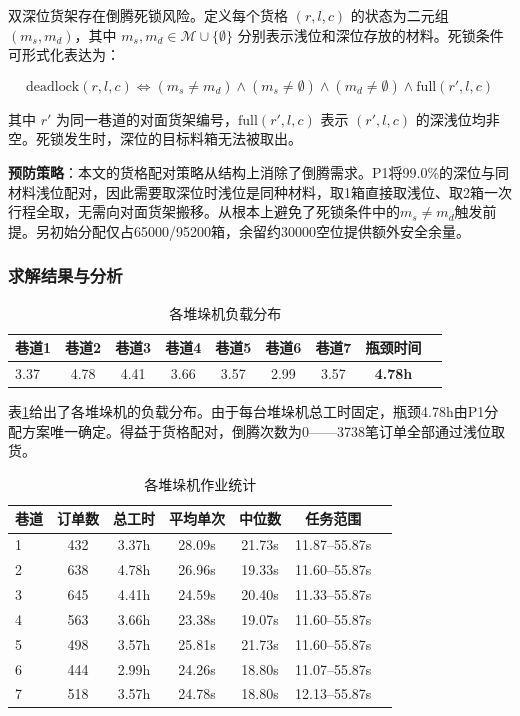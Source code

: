 \documentclass[a4paper]{cumcmthesis}
\newcommand{\headcol}{\rowcolor{tableheadcolor}}
\begin{document}
双深位货架存在倒腾死锁风险。定义每个货格 $(r,l,c)$ 的状态为二元组 $(m_s, m_d)$，其中 $m_s, m_d\in\mathcal{M}\cup\{\emptyset\}$ 分别表示浅位和深位存放的材料。死锁条件可形式化表达为：

\begin{equation}
\text{deadlock}(r,l,c) \iff (m_s\neq m_d) \land (m_s\neq\emptyset) \land (m_d\neq\emptyset) \land \text{full}(r',l,c)
\end{equation}

其中 $r'$ 为同一巷道的对面货架编号，$\text{full}(r',l,c)$ 表示 $(r',l,c)$ 的深浅位均非空。死锁发生时，深位的目标料箱无法被取出。

\textbf{预防策略}：本文的货格配对策略从结构上消除了倒腾需求。P1将99.0\%的深位与同材料浅位配对，因此需要取深位时浅位是同种材料，取1箱直接取浅位、取2箱一次行程全取，无需向对面货架搬移。从根本上避免了死锁条件中的$m_s\neq m_d$触发前提。另初始分配仅占65000/95200箱，余留约30000空位提供额外安全余量。

\FloatBarrier\subsubsection{求解结果与分析}

\begin{table}[htbp]
\centering\small
\caption{各堆垛机负载分布}
\label{tab:crane_load}
\begin{tabular}{lccccccc|c}
\toprule
\headcol 巷道1 & 巷道2 & 巷道3 & 巷道4 & 巷道5 & 巷道6 & 巷道7 & 瓶颈时间 \\
\midrule
3.37 & 4.78 & 4.41 & 3.66 & 3.57 & 2.99 & 3.57 & \textbf{4.78h} \\
\bottomrule
\end{tabular}
\end{table}

表\ref{tab:crane_load}给出了各堆垛机的负载分布。由于每台堆垛机总工时固定，瓶颈4.78h由P1分配方案唯一确定。得益于货格配对，倒腾次数为0——3738笔订单全部通过浅位取货。

\begin{table}[htbp]
\centering\small
\caption{各堆垛机作业统计}
\label{tab:crane_schedule}
\begin{tabular}{lcccccc}
\toprule
\headcol 巷道 & 订单数 & 总工时 & 平均单次 & 中位数 & 任务范围 \\
\midrule
1 & 432 & 3.37h & 28.09s & 21.73s & 11.87--55.87s \\
2 & 638 & 4.78h & 26.96s & 19.33s & 11.60--55.87s \\
3 & 645 & 4.41h & 24.59s & 20.40s & 11.33--55.87s \\
4 & 563 & 3.66h & 23.38s & 19.07s & 11.60--55.87s \\
5 & 498 & 3.57h & 25.81s & 21.73s & 11.60--55.87s \\
6 & 444 & 2.99h & 24.26s & 18.80s & 11.07--55.87s \\
7 & 518 & 3.57h & 24.78s & 18.80s & 12.13--55.87s \\
\bottomrule
\end{tabular}
\end{table}
\end{document}
